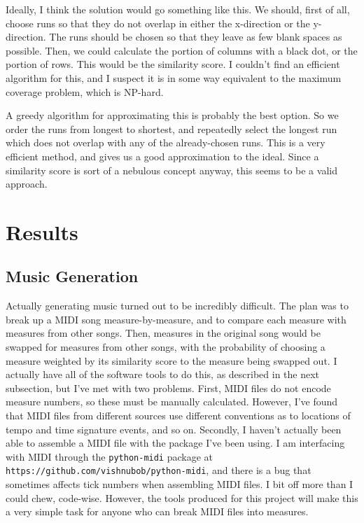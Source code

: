\documentclass{article}
\begin{document}
Ideally, I think the solution would go something like this. We should, first of all, choose runs so that they do not overlap in either the x-direction or the y-direction. The runs should be chosen so that they leave as few blank spaces as possible. Then, we could calculate the portion of columns with a black dot, or the portion of rows. This would be the similarity score. I couldn't find an efficient algorithm for this, and I suspect it is in some way equivalent to the maximum coverage problem, which is NP-hard.

A greedy algorithm for approximating this is probably the best option. So we order the runs from longest to shortest, and repeatedly select the longest run which does not overlap with any of the already-chosen runs. This is a very efficient method, and gives us a good approximation to the ideal. Since a similarity score is sort of a nebulous concept anyway, this seems to be a valid approach.

\section{Results}
\subsection{Music Generation}
Actually generating music turned out to be incredibly difficult. The plan was to break up a MIDI song measure-by-measure, and to compare each measure with measures from other songs. Then, measures in the original song would be swapped for measures from other songs, with the probability of choosing a measure weighted by its similarity score to the measure being swapped out. I actually have all of the software tools to do this, as described in the next subsection, but I've met with two problems. First, MIDI files do not encode measure numbers, so these must be manually calculated. However, I've found that MIDI files from different sources use different conventions as to locations of tempo and time signature events, and so on. Secondly, I haven't actually been able to assemble a MIDI file with the package I've been using. I am interfacing with MIDI through the \texttt{python-midi} package at \texttt{https://github.com/vishnubob/python-midi}, and there is a bug that sometimes affects tick numbers when assembling MIDI files. I bit off more than I could chew, code-wise. However, the tools produced for this project will make this a very simple task for anyone who can break MIDI files into measures.
\end{document}
